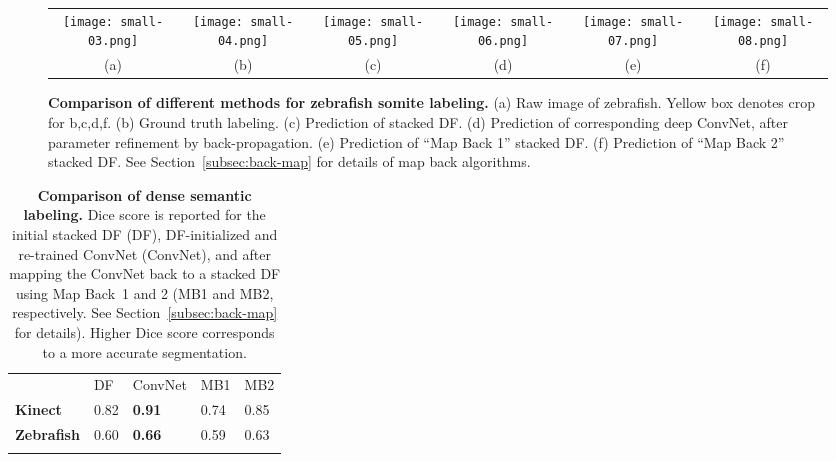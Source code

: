 \documentclass[twocolumn]{svjour3}
\begin{document}
\begin{figure*}
\begin{center}
\begin{tabular}{cccccc}

   \texttt{[image: small-03.png]} &
   \texttt{[image: small-04.png]} &
   \texttt{[image: small-05.png]} &
	 \texttt{[image: small-06.png]} &
	 \texttt{[image: small-07.png]} &
	 \texttt{[image: small-08.png]} \\
	 			  (a) & (b) & (c) & (d) & (e) & (f)
\end{tabular}
\end{center}
   \caption{\textbf{Comparison of different methods for zebrafish somite labeling.} (a) Raw image of zebrafish.  Yellow box denotes crop for b,c,d,f. (b) Ground truth labeling. (c) Prediction of stacked DF. (d) Prediction of corresponding deep ConvNet, after parameter refinement by back-propagation. (e) Prediction of ``Map Back 1'' stacked DF. (f) Prediction of ``Map Back 2'' stacked DF. See Section~\ref{subsec:back-map} for details of map back algorithms.}
\label{fig:comparison}
\end{figure*}

%
\begin{table}
  	\caption{\textbf{Comparison of dense semantic labeling. } Dice score is reported for the initial stacked DF (DF), DF-initialized and re-trained ConvNet (ConvNet), and after mapping the ConvNet back to a stacked DF using Map Back~1 and 2 (MB1 and MB2, respectively. See Section~\ref{subsec:back-map} for details). Higher Dice score corresponds to a more accurate segmentation.}
	\label{tab:dice-score}
	\begin{center}
		\begin{tabular}{lllll}
			\hline\noalign{\smallskip}
			& DF & ConvNet & MB1 & MB2  \\
			\noalign{\smallskip}\hline\noalign{\smallskip}
			\textbf{Kinect} & 0.82 & \textbf{0.91} & 0.74 & 0.85 \\
			\textbf{Zebrafish} & 0.60 & \textbf{0.66} & 0.59 & 0.63 \\
			\noalign{\smallskip}\hline
   		\end{tabular}
	\end{center}
\end{table}
\end{document}
